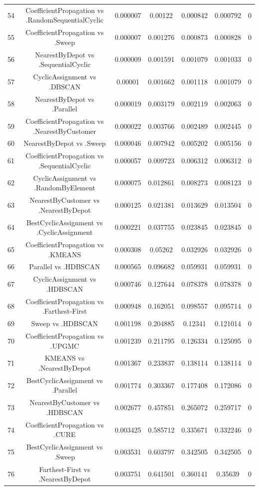 \documentclass[a4paper,10pt]{article}
\begin{document}
\begin{landscape}
\begin{table}[!htp]
\begin{tabular}{ccccccc}
54&CoefficientPropagation vs .RandomSequentialCyclic&0.000007&0.00122&0.000842&0.000792&0\\
55&CoefficientPropagation vs .Sweep&0.000007&0.001276&0.000873&0.000828&0\\
56&NearestByDepot vs .SequentialCyclic&0.000009&0.001591&0.001079&0.001033&0\\
57&CyclicAssignment vs .DBSCAN&0.00001&0.001662&0.001118&0.001079&0\\
58&NearestByDepot vs .Parallel&0.000019&0.003179&0.002119&0.002063&0\\
59&CoefficientPropagation vs .NearestByCustomer&0.000022&0.003766&0.002489&0.002445&0\\
60&NearestByDepot vs .Sweep&0.000046&0.007942&0.005202&0.005156&0\\
61&CoefficientPropagation vs .SequentialCyclic&0.000057&0.009723&0.006312&0.006312&0\\
62&CyclicAssignment vs .RandomByElement&0.000075&0.012861&0.008273&0.008123&0\\
63&NearestByCustomer vs .NearestByDepot&0.000125&0.021381&0.013629&0.013504&0\\
64&BestCyclicAssignment vs .CyclicAssignment&0.000221&0.037755&0.023845&0.023845&0\\
65&CoefficientPropagation vs .KMEANS&0.000308&0.05262&0.032926&0.032926&0\\
66&Parallel vs .HDBSCAN&0.000565&0.096682&0.059931&0.059931&0\\
67&CyclicAssignment vs .HDBSCAN&0.000746&0.127644&0.078378&0.078378&0\\
68&CoefficientPropagation vs .Farthest-First&0.000948&0.162051&0.098557&0.095714&0\\
69&Sweep vs .HDBSCAN&0.001198&0.204885&0.12341&0.121014&0\\
70&CoefficientPropagation vs .UPGMC&0.001239&0.211795&0.126334&0.125095&0\\
71&KMEANS vs .NearestByDepot&0.001367&0.233837&0.138114&0.138114&0\\
72&BestCyclicAssignment vs .Parallel&0.001774&0.303367&0.177408&0.172086&0\\
73&NearestByCustomer vs .HDBSCAN&0.002677&0.457851&0.265072&0.259717&0\\
74&CoefficientPropagation vs .CURE&0.003425&0.585712&0.335671&0.332246&0\\
75&BestCyclicAssignment vs .Sweep&0.003531&0.603797&0.342505&0.342505&0\\
76&Farthest-First vs .NearestByDepot&0.003751&0.641501&0.360141&0.35639&0\\

\end{tabular}
\end{table}
\end{landscape}
\end{document}
